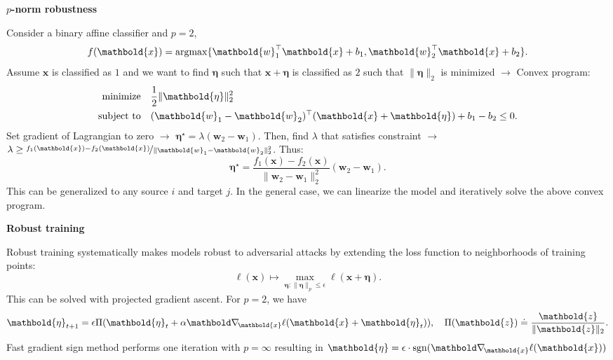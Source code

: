 \documentclass[10pt]{article}
\newenvironment{topic}[1]
{\textbf{\sffamily \footnotesize \colorbox{black}{\rlap{\textbf{\textcolor{white}{#1}}}\hspace{\linewidth}\hspace{-2\fboxsep}}}}
{}
\newenvironment{subtopic}[1]
{\vspace{0.1cm} \begin{center}\textbf{\footnotesize \sffamily #1}\end{center}}
{}
\renewcommand{\vec}[1]{\ensuremath{\mathbold{#1}}}
\begin{document}
\begin{multicols*}{3}
\begin{topic}{Adversarial attacks}
\begin{subtopic}{$p$-norm robustness}
            Consider a binary affine classifier and $p=2$, \[
                f(\vec{x}) = \argmax \{ \transpose{\vec{w}_1} \vec{x} + b_1, \transpose{\vec{w}_2}\vec{x} + b_2 \}.
            \]
            Assume $\vec{x}$ is classified as $1$ and we want to find $\vec{\eta}$ such that $\vec{x} +
                \vec{\eta}$ is classified as $2$ such that $\| \vec{\eta} \|_2$ is minimized $\to$ Convex program:
            \begin{align*}
                \text{minimize}   & \quad \frac{1}{2} \| \vec{\eta} \|_2^2                                               \\
                \text{subject to} & \quad \transpose{(\vec{w}_1 - \vec{w}_2)} (\vec{x} + \vec{\eta}) + b_1 - b_2 \leq 0.
            \end{align*}
            Set gradient of Lagrangian to zero $\to$ $\vec{\eta}^\star = \lambda (\vec{w}_2 -
                \vec{w}_1)$. Then, find $\lambda$ that satisfies constraint $\to$ $\lambda \geq
                \nicefrac{f_1(\vec{x}) - f_2(\vec{x})}{\| \vec{w}_1 - \vec{w}_2 \|_2^2}$. Thus: \[
                \vec{\eta}^\star = \frac{f_1(\vec{x}) - f_2(\vec{x})}{\| \vec{w}_2 - \vec{w}_1 \|_2^2} (\vec{w}_2 - \vec{w}_1).
            \]
            This can be generalized to any source $i$ and target $j$. In the general case, we can linearize the
            model and iteratively solve the above convex program.
        \end{subtopic}

        \begin{subtopic}{Robust training}
            Robust training systematically makes models robust to adversarial attacks by extending the loss function to neighborhoods of training points: \[
                \ell(\vec{x}) \mapsto \max_{\vec{\eta} : \| \vec{\eta} \|_p \leq \epsilon} \ell(\vec{x} + \vec{\eta}).
            \]
            This can be solved with projected gradient ascent. For $p=2$, we have \[
                \vec{\eta}_{t+1} = \epsilon \Pi(\vec{\eta}_t + \alpha \grad{\ell(\vec{x} + \vec{\eta}_t)}{\vec{x}}), \quad \Pi(\vec{z}) \doteq \frac{\vec{z}}{\| \vec{z} \|_2}.
            \]
            Fast gradient sign method performs one iteration with $p=\infty$ resulting in $\vec{\eta} =
                \epsilon\cdot\mathrm{sgn}(\grad{\ell(\vec{x})}{\vec{x}})$

        \end{subtopic}

    \end{topic}

\end{multicols*}
\end{document}

